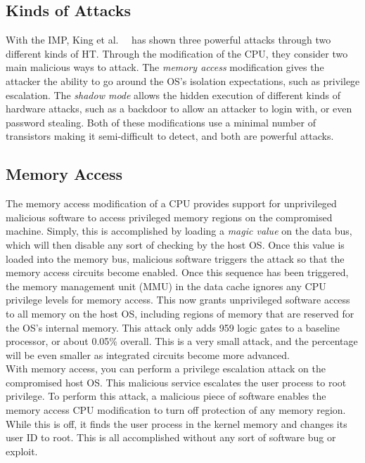 \documentclass[letterpaper,twocolumn,11pt]{article}
\begin{document}
\subsection{Kinds of Attacks}
With the IMP, King et al.\ ~\cite {king} has shown three powerful attacks through two different kinds of HT. Through the modification of the CPU, they consider two main malicious ways to attack. The {\em memory access} modification gives the attacker the ability to go around the OS's isolation expectations, such as privilege escalation. The {\em shadow mode} allows the hidden execution of different kinds of hardware attacks, such as a backdoor to allow an attacker to login with, or even password stealing. Both of these modifications use a minimal number of transistors making it semi-difficult to detect, and both are powerful attacks.

\subsection{Memory Access}
The memory access modification of a CPU provides support for unprivileged malicious software to access privileged memory regions on the compromised machine. Simply, this is accomplished by loading a {\em magic value} on the data bus, which will then disable any sort of checking by the host OS. Once this value is loaded into the memory bus, malicious software triggers the attack so that the memory access circuits become enabled. Once this sequence has been triggered, the memory management unit (MMU) in the data cache ignores any CPU privilege levels for memory access. This now grants unprivileged software access to all memory on the host OS, including regions of memory that are reserved for the OS's internal memory. This attack only adds 959 logic gates to a baseline processor, or about 0.05\% overall. This is a very small attack, and the percentage will be even smaller as integrated circuits become more advanced. \\

With memory access, you can perform a privilege escalation attack on the compromised host OS. This malicious service escalates the user process to root privilege. To perform this attack, a malicious piece of software enables the memory access CPU modification to turn off protection of any memory region. While this is off, it finds the user process in the kernel memory and changes its user ID to root. This is all accomplished without any sort of software bug or exploit.
\end{document}
